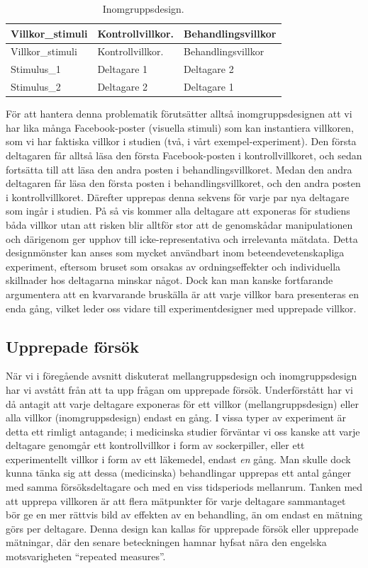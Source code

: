 \documentclass[
]{book}
\begin{document}
\begin{longtable}[]{@{}lll@{}}
\caption{\label{tab:tab-02-07-5-4-02}Inomgruppsdesign.}\tabularnewline
\toprule
Villkor\_stimuli & Kontrollvillkor. & Behandlingsvillkor\tabularnewline
\midrule
\endfirsthead
\toprule
Villkor\_stimuli & Kontrollvillkor. & Behandlingsvillkor\tabularnewline
\midrule
\endhead
Stimulus\_1 & Deltagare 1 & Deltagare 2\tabularnewline
Stimulus\_2 & Deltagare 2 & Deltagare 1\tabularnewline
\bottomrule
\end{longtable}

För att hantera denna problematik förutsätter alltså inomgruppsdesignen att vi har lika många Facebook-poster (visuella stimuli) som kan instantiera villkoren, som vi har faktiska villkor i studien (två, i vårt exempel-experiment). Den första deltagaren får alltså läsa den första Facebook-posten i kontrollvillkoret, och sedan fortsätta till att läsa den andra posten i behandlingsvillkoret. Medan den andra deltagaren får läsa den första posten i behandlingsvillkoret, och den andra posten i kontrollvillkoret. Därefter upprepas denna sekvens för varje par nya deltagare som ingår i studien. På så vis kommer alla deltagare att exponeras för studiens båda villkor utan att risken blir alltför stor att de genomskådar manipulationen och därigenom ger upphov till icke-representativa och irrelevanta mätdata. Detta designmönster kan anses som mycket användbart inom beteendevetenskapliga experiment, eftersom bruset som orsakas av ordningseffekter och individuella skillnader hos deltagarna minskar något. Dock kan man kanske fortfarande argumentera att en kvarvarande bruskälla är att varje villkor bara presenteras en enda gång, vilket leder oss vidare till experimentdesigner med upprepade villkor.

\hypertarget{sub07.5.5}{%
\subsection{Upprepade försök}\label{sub07.5.5}}

När vi i föregående avsnitt diskuterat mellangruppsdesign och inomgruppsdesign har vi avstått från att ta upp frågan om upprepade försök. Underförstått har vi då antagit att varje deltagare exponeras för ett villkor (mellangruppsdesign) eller alla villkor (inomgruppsdesign) endast en gång. I vissa typer av experiment är detta ett rimligt antagande; i medicinska studier förväntar vi oss kanske att varje deltagare genomgår ett kontrollvillkor i form av sockerpiller, eller ett experimentellt villkor i form av ett läkemedel, endast \emph{en} gång. Man skulle dock kunna tänka sig att dessa (medicinska) behandlingar upprepas ett antal gånger med samma försöksdeltagare och med en viss tidsperiods mellanrum. Tanken med att upprepa villkoren är att flera mätpunkter för varje deltagare sammantaget bör ge en mer rättvis bild av effekten av en behandling, än om endast en mätning görs per deltagare. Denna design kan kallas för upprepade försök eller upprepade mätningar, där den senare beteckningen hamnar hyfsat nära den engelska motsvarigheten ``repeated measures''.
\end{document}
